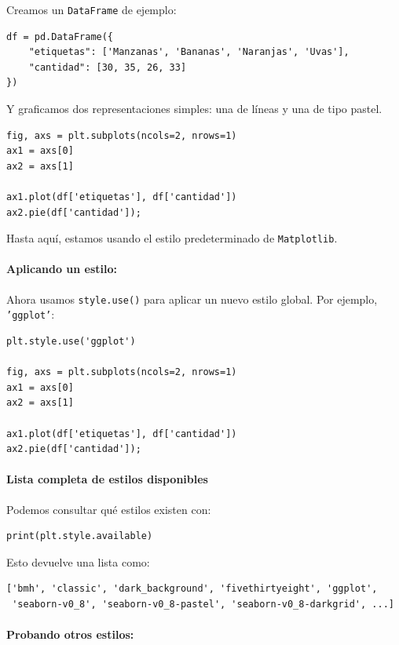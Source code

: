 \documentclass{article}
\theoremstyle{nonumberplain}
\begin{document}
Creamos un \texttt{DataFrame} de ejemplo:

\begin{verbatim}
df = pd.DataFrame({
    "etiquetas": ['Manzanas', 'Bananas', 'Naranjas', 'Uvas'],
    "cantidad": [30, 35, 26, 33]
})
\end{verbatim}

Y graficamos dos representaciones simples: una de líneas y una de tipo pastel.

\begin{verbatim}
fig, axs = plt.subplots(ncols=2, nrows=1)
ax1 = axs[0]
ax2 = axs[1]

ax1.plot(df['etiquetas'], df['cantidad'])
ax2.pie(df['cantidad']);
\end{verbatim}

Hasta aquí, estamos usando el estilo predeterminado de \texttt{Matplotlib}.

\paragraph{Aplicando un estilo:}

Ahora usamos \texttt{style.use()} para aplicar un nuevo estilo global. Por ejemplo, \texttt{'ggplot'}:

\begin{verbatim}
plt.style.use('ggplot')

fig, axs = plt.subplots(ncols=2, nrows=1)
ax1 = axs[0]
ax2 = axs[1]

ax1.plot(df['etiquetas'], df['cantidad'])
ax2.pie(df['cantidad']);
\end{verbatim}

\paragraph{Lista completa de estilos disponibles}

Podemos consultar qué estilos existen con:

\begin{verbatim}
print(plt.style.available)
\end{verbatim}

Esto devuelve una lista como:

\begin{verbatim}
['bmh', 'classic', 'dark_background', 'fivethirtyeight', 'ggplot',
 'seaborn-v0_8', 'seaborn-v0_8-pastel', 'seaborn-v0_8-darkgrid', ...]
\end{verbatim}

\paragraph{Probando otros estilos:}
\end{document}
